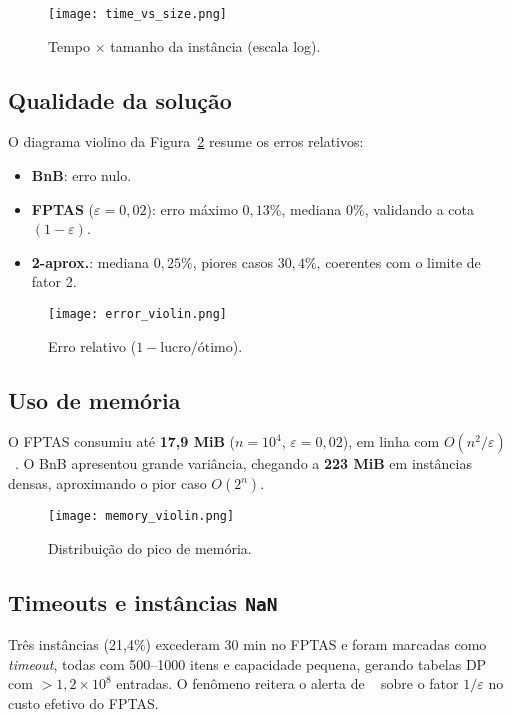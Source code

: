 \documentclass[10pt,a4paper]{article}
\begin{document}
\begin{figure}[h]
  \centering
  \texttt{[image: time\_vs\_size.png]}
  \caption{Tempo $\times$ tamanho da instância (escala log).}
  \label{fig:tempo}
\end{figure}

\subsection{Qualidade da solução}\label{sec:qual}
O diagrama violino da Figura~\ref{fig:erro} resume os erros relativos:
\begin{itemize}
  \item \textbf{BnB}: erro nulo.
  \item \textbf{FPTAS} ($\varepsilon=0{,}02$):
        erro máximo $0{,}13\%$,
        mediana $0\%$, validando a cota $(1-\varepsilon)$.
  \item \textbf{2-aprox.}: mediana $0{,}25\%$,
        piores casos $30,4\%$, coerentes com o limite de fator 2.
\end{itemize}

\begin{figure}[h]
  \centering
  \texttt{[image: error\_violin.png]}
  \caption{Erro relativo ($1-\text{lucro}/\text{ótimo}$).}
  \label{fig:erro}
\end{figure}

\subsection{Uso de memória}\label{sec:mem}
O FPTAS consumiu até \textbf{17,9 MiB} ($n=10^{4}$,
$\varepsilon=0{,}02$), em linha com
$O(n^{2}/\varepsilon)$~\cite{aula15}.  O BnB apresentou grande
variância, chegando a \textbf{223 MiB} em instâncias densas,
aproximando o pior caso $O(2^{n})$.

\begin{figure}[h]
  \centering
  \texttt{[image: memory\_violin.png]}
  \caption{Distribuição do pico de memória.}
  \label{fig:mem}
\end{figure}

\subsection{Timeouts e instâncias \texttt{NaN}}\label{sec:nan}
Três instâncias (\textrm{21,4}\%) excederam 30 min no FPTAS e
foram marcadas como \textit{timeout}, todas com 500–1000 itens e
capacidade pequena, gerando tabelas DP com
$>\!1{,}2\times10^{8}$ entradas.  O fenômeno reitera o alerta de
\citeauthor{IbarraKim1975}~\cite{aula15} sobre o fator $1/\varepsilon$
no custo efetivo do FPTAS.
\end{document}
